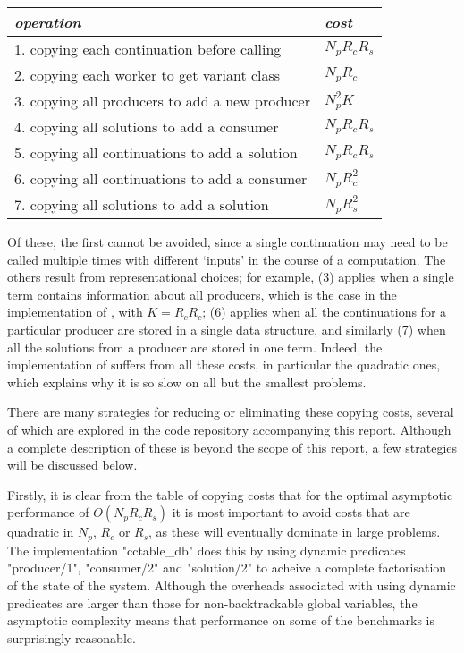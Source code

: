 \begin{center}
\begin{tabular}{ll}
  \emph{operation} & \emph{cost} \\
  \hline
  1. copying each continuation before calling    & $N_p R_c R_s$ \\
  2. copying each worker to get variant class    & $N_p R_c$ \\
  3. copying all producers to add a new producer & $N_p^2 K $ \\
  4. copying all solutions to add a consumer     & $N_p R_c R_s$ \\
  5. copying all continuations to add a solution & $N_p R_c R_s$ \\
  6. copying all continuations to add a consumer & $N_p R_c^2$ \\
  7. copying all solutions to add a solution     & $N_p R_s^2$ \\
\end{tabular}
\end{center}
%
Of these, the first cannot be avoided, since a single continuation may need to
be called multiple times with different `inputs' in the course of a computation.
The others result from representational choices; for example, (3) applies when
a single term contains information about all producers, which is the case
in the implementation of , with $K = R_c R_c$; (6) applies
when all the continuations for a particular producer are stored in a single
data structure, and similarly (7) when all the solutions from a producer are
stored in one term. Indeed, the implementation of  suffers from
all these costs, in particular the quadratic ones, which explains why it is so slow
on all but the smallest problems.

There are many strategies for reducing or eliminating these copying costs,
several of which are explored in the code repository accompanying this report.
Although a complete description of these is beyond the scope of this report, a few
strategies will be discussed below.

Firstly, it is clear from the table of copying costs that for the optimal asymptotic 
performance of $O(N_p R_c R_s)$ it is most important to avoid costs that are quadratic 
in $N_p$, $R_c$ or $R_s$, as these will eventually dominate in large problems.
The implementation "cctable_db" does this by using dynamic predicates "producer/1",
"consumer/2" and "solution/2" to acheive a complete factorisation of the state of
the system. Although the overheads associated with using dynamic predicates are larger
than those for non-backtrackable global variables, the asymptotic complexity means
that performance on some of the benchmarks is surprisingly reasonable.

